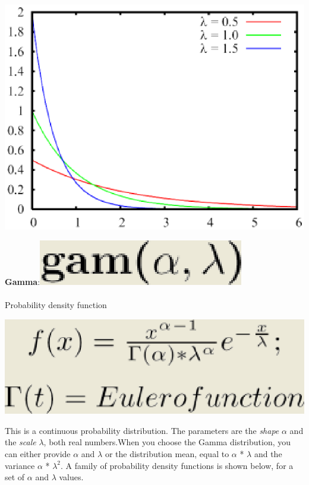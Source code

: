 \begin{center}
\includegraphics[scale=.5]{img/jsim/exp_pdf.eps}
\end{center}
\textbf{Gamma}:\includegraphics[scale=.5]{img/jsim/gamma_f.eps}\\\\
Probability density function\\
\begin{center}
\includegraphics[scale=.5]{img/jsim/gamma1.eps}
\end{center}
This is a continuous probability  distribution. The parameters are the \emph{shape} $\alpha$ and the \emph{scale} $\lambda$, both real numbers.When you choose the Gamma distribution, you can either provide $\alpha$ and $\lambda$ or the distribution mean, equal to $\alpha$ * $\lambda$   and the variance $\alpha$ * $\lambda ^ 2$.   
A family of probability density functions is shown below, for a set of $\alpha$ and $\lambda$ values.
